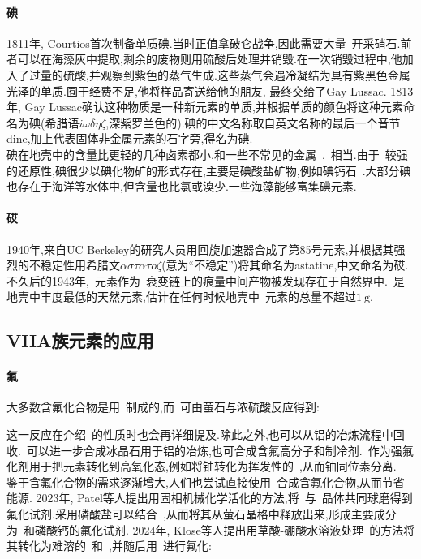 \documentclass{ctexbook}
\begin{document}
\paragraph{碘}
1811年, Courtios首次制备单质碘.当时正值拿破仑战争,因此需要大量~开采硝石.前者可以在海藻灰中提取,剩余的废物则用硫酸后处理并销毁.在一次销毁过程中,他加入了过量的硫酸,并观察到紫色的蒸气生成.这些蒸气会遇冷凝结为具有紫黑色金属光泽的单质.囿于经费不足,他将样品寄送给他的朋友, 最终交给了Gay Lussac. 1813年, Gay Lussac确认这种物质是一种新元素的单质,并根据单质的颜色将这种元素命名为碘(希腊语$i\omega\delta\eta\zeta$,深紫罗兰色的).碘的中文名称取自英文名称的最后一个音节dine,加上代表固体非金属元素的石字旁,得名为碘.\\
\indent 碘在地壳中的含量比更轻的几种卤素都小,和一些不常见的金属~,~相当.由于~较强的还原性,碘很少以碘化物矿的形式存在,主要是碘酸盐矿物,例如碘钙石~.大部分碘也存在于海洋等水体中,但含量也比氯或溴少.一些海藻能够富集碘元素.
\paragraph{砹}
1940年,来自UC Berkeley的研究人员用回旋加速器合成了第85号元素,并根据其强烈的不稳定性用希腊文$\alpha\sigma\tau\alpha\tau o\zeta$(意为``不稳定'')将其命名为astatine,中文命名为砹.\\
\indent 不久后的1943年,~元素作为~衰变链上的痕量中间产物被发现存在于自然界中.~是地壳中丰度最低的天然元素,估计在任何时候地壳中~元素的总量不超过$\SI{1}{\gram}$\cite{Hollerman2001}.
\subsection{VIIA族元素的应用}
\paragraph{氟}
大多数含氟化合物是用~制成的,而~可由萤石与浓硫酸反应得到:
\begin{tightcenter}
\end{tightcenter}
这一反应在介绍~的性质时也会再详细提及.除此之外,也可以从铝的冶炼流程中回收.~可以进一步合成冰晶石用于铝的冶炼,也可合成含氟高分子和制冷剂.~作为强氟化剂用于把元素转化到高氧化态,例如将铀转化为挥发性的~,从而铀同位素分离.\\
\indent 鉴于含氟化合物的需求逐渐增大,人们也尝试直接使用~合成含氟化合物,从而节省能源. 2023年, Patel等人提出用固相机械化学活化的方法,将~与~晶体共同球磨得到氟化试剂\cite{Patel2023}.采用磷酸盐可以结合~,从而将其从萤石晶格中释放出来,形成主要成分为~和磷酸钙的氟化试剂. 2024年, Klose等人提出用草酸-硼酸水溶液处理~的方法将其转化为难溶的~和~,并随后用~进行氟化\cite{Klose2024}:
\begin{tightcenter}
\end{tightcenter}
\end{document}
